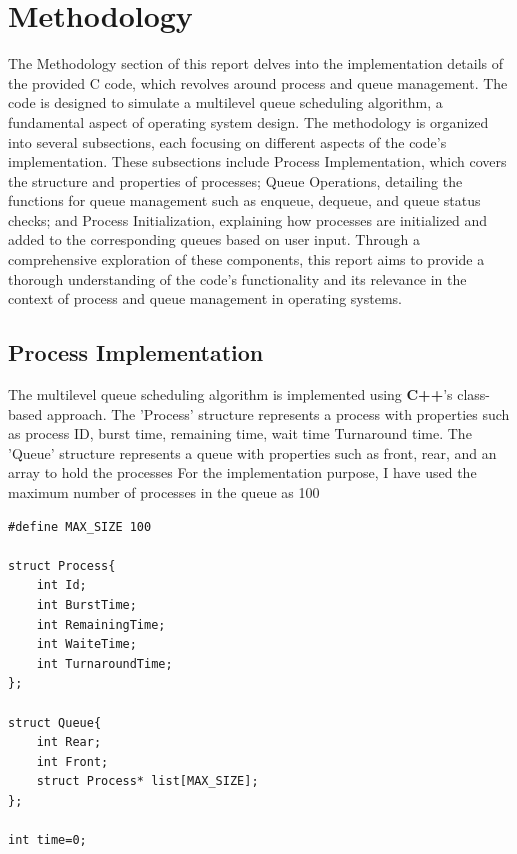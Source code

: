 \documentclass{article}
\begin{document}
\section{Methodology}
\vspace{\baselineskip}
The Methodology section of this report delves into the implementation details of the provided C code, which revolves around process and queue management. The code is designed to simulate a multilevel queue scheduling algorithm, a fundamental aspect of operating system design. The methodology is organized into several subsections, each focusing on different aspects of the code's implementation. These subsections include Process Implementation, which covers the structure and properties of processes; Queue Operations, detailing the functions for queue management such as enqueue, dequeue, and queue status checks; and Process Initialization, explaining how processes are initialized and added to the corresponding queues based on user input. Through a comprehensive exploration of these components, this report aims to provide a thorough understanding of the code's functionality and its relevance in the context of process and queue management in operating systems.

\subsection{Process Implementation}
\vspace{\baselineskip}
The multilevel queue scheduling algorithm is implemented using \textbf{C++}’s class-based approach.
The ’Process’ structure represents a process with properties such as process ID, burst time, remaining time, wait time Turnaround time. 
The ’Queue’ structure represents a queue with properties such as front, rear, and an array to hold the processes
For the implementation purpose, I have used the maximum number of processes in the queue as 100
\\
\begin{lstlisting}
#define MAX_SIZE 100

struct Process{
    int Id;                                
    int BurstTime;                        
    int RemainingTime;                    
    int WaiteTime;                        
    int TurnaroundTime;                   
};

struct Queue{                             
    int Rear;                             
    int Front;                            
    struct Process* list[MAX_SIZE];       
};

int time=0;

\end{lstlisting}
\end{document}
